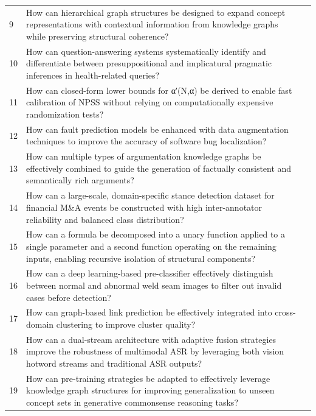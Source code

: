 \begin{longtable}{@{}p{0.5cm}p{7.2cm}p{2.5cm}@{}}
9 & How can hierarchical graph structures be designed to expand concept representations with contextual information from knowledge graphs while preserving structural coherence? & \cite{10.1609/aaai.v35i7.16796} \\
10 & How can question-answering systems systematically identify and differentiate between presuppositional and implicatural pragmatic inferences in health-related queries? & \cite{10.18653/v1/2024.naacl-long.403} \\
11 & How can closed-form lower bounds for α′(N,α) be derived to enable fast calibration of NPSS without relying on computationally expensive randomization tests? & \cite{10.1609/aaai.v36i4.20339} \\
12 & How can fault prediction models be enhanced with data augmentation techniques to improve the accuracy of software bug localization? & \cite{10.1609/aaai.v33i01.33019446} \\
13 & How can multiple types of argumentation knowledge graphs be effectively combined to guide the generation of factually consistent and semantically rich arguments? & \cite{10.18653/v1/2021.acl-long.366} \\
14 & How can a large-scale, domain-specific stance detection dataset for financial M\&A events be constructed with high inter-annotator reliability and balanced class distribution? & \cite{10.18653/v1/2020.acl-main.157} \\
15 & How can a formula be decomposed into a unary function applied to a single parameter and a second function operating on the remaining inputs, enabling recursive isolation of structural components? & \cite{10.1609/aaai.v38i8.28641} \\
16 & How can a deep learning-based pre-classifier effectively distinguish between normal and abnormal weld seam images to filter out invalid cases before detection? & \cite{10.1609/aaai.v37i13.26834} \\
17 & How can graph-based link prediction be effectively integrated into cross-domain clustering to improve cluster quality? & \cite{10.1609/aaai.v36i11.21654} \\
18 & How can a dual-stream architecture with adaptive fusion strategies improve the robustness of multimodal ASR by leveraging both vision hotword streams and traditional ASR outputs? & \cite{10.18653/v1/2024.emnlp-main.821} \\
19 & How can pre-training strategies be adapted to effectively leverage knowledge graph structures for improving generalization to unseen concept sets in generative commonsense reasoning tasks? & \cite{10.1609/aaai.v35i7.16796} \\

\end{longtable}
